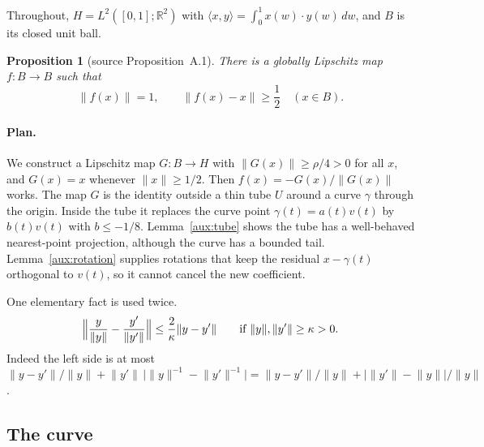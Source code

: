 \documentclass[11pt]{article}
\newcommand{\R}{\mathbb R}
\newcommand{\norm}[1]{\lVert #1\rVert}
\newcommand{\ip}[2]{\langle #1,#2\rangle}
\newtheorem{proposition}[theorem]{Proposition}
\theoremstyle{definition}
\numberwithin{equation}{section}
\begin{document}
Throughout, \(H=L^2([0,1];\R^2)\) with
\(\ip xy=\int_0^1x(w)\cdot y(w)\,dw\), and \(B\) is its closed unit ball.

\begin{proposition}[source Proposition~A.1]\label{aux:map}
There is a globally Lipschitz map \(f:B\to B\) such that
\[
  \norm{f(x)}=1,
  \qquad \norm{f(x)-x}\ge\frac12
  \quad(x\in B).
\]
\end{proposition}

\paragraph{Plan.} We construct a Lipschitz map \(G:B\to H\) with
\(\norm{G(x)}\ge\rho/4>0\) for all \(x\), and \(G(x)=x\) whenever
\(\norm x\ge1/2\). Then \(f(x)=-G(x)/\norm{G(x)}\) works. The map \(G\) is
the identity outside a thin tube \(U\) around a curve \(\gamma\) through
the origin. Inside the tube it replaces the curve point
\(\gamma(t)=a(t)v(t)\) by \(b(t)v(t)\) with \(b\le-1/8\).
Lemma~\ref{aux:tube} shows the tube has a well-behaved nearest-point
projection, although the curve has a bounded tail.
Lemma~\ref{aux:rotation} supplies rotations that keep the residual
\(x-\gamma(t)\) orthogonal to \(v(t)\), so it cannot cancel the new
coefficient.

One elementary fact is used twice.
\begin{equation}\label{aux:normalize}
  \Bigl\|\frac{y}{\norm y}-\frac{y'}{\norm{y'}}\Bigr\|
  \le\frac{2}{\kappa}\norm{y-y'}
  \qquad\text{if }\norm y,\norm{y'}\ge\kappa>0 .
\end{equation}
Indeed the left side is at most
\(\norm{y-y'}/\norm y+\norm{y'}\,\bigl|\norm{y}^{-1}-\norm{y'}^{-1}\bigr|
=\norm{y-y'}/\norm y+\bigl|\norm{y'}-\norm y\bigr|/\norm y\).

\subsection{The curve}
\end{document}
